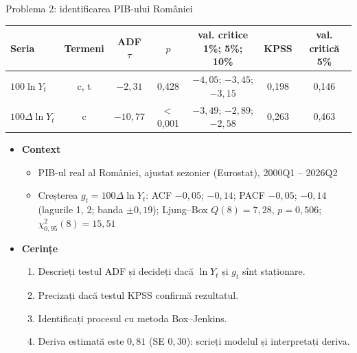 \begin{frame}{Problema 2: identificarea PIB-ului României}
\itemsize{\footnotesize}
\begin{center}
\scriptsize
\begin{tabular}{lcccccc}
\toprule
\textbf{Seria} & Termeni & ADF $\tau$ & $p$ & val. critice 1\%; 5\%; 10\% & KPSS & val. critică 5\% \\
\midrule
$100\ln Y_t$ & c, t & $\ensuremath{-}2{,}31$ & 0{,}428 & $\ensuremath{-}4{,}05$; $\ensuremath{-}3{,}45$; $\ensuremath{-}3{,}15$ & 0{,}198 & 0{,}146 \\
$100\Delta\ln Y_t$ & c & $\ensuremath{-}10{,}77$ & $<$\,0{,}001 & $\ensuremath{-}3{,}49$; $\ensuremath{-}2{,}89$; $\ensuremath{-}2{,}58$ & 0{,}263 & 0{,}463 \\
\bottomrule
\end{tabular}
\end{center}
\begin{itemize}
    \item \textbf{Context}
    \begin{itemize}
        \item PIB-ul real al României, ajustat sezonier (Eurostat), 2000Q1 -- 2026Q2
        \item Creșterea $g_t = 100\Delta\ln Y_t$: ACF $\ensuremath{-}0{,}05$; $\ensuremath{-}0{,}14$; PACF $\ensuremath{-}0{,}05$; $\ensuremath{-}0{,}14$ (lagurile 1, 2; banda $\pm 0{,}19$); Ljung--Box $Q(8) = 7{,}28$, $p = 0{,}506$; $\chi^2_{0,95}(8) = 15{,}51$
    \end{itemize}
    \item \textbf{Cerințe}
\begin{enumerate}
    \item Descrieți testul ADF și decideți dacă $\ln Y_t$ și $g_t$ sînt staționare.
    \item Precizați dacă testul KPSS confirmă rezultatul.
    \item Identificați procesul cu metoda Box--Jenkins.
    \item Deriva estimată este $0{,}81$ (SE $0{,}30$): scrieți modelul și interpretați deriva.
\end{enumerate}
\end{itemize}
\end{frame}

